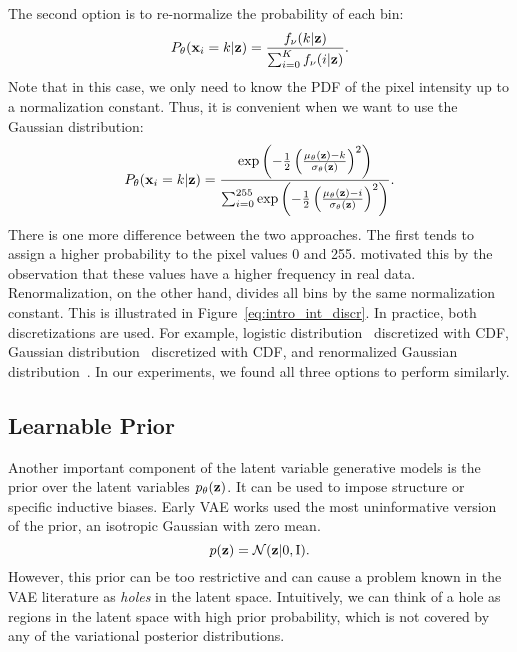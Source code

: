 The second option is to re-normalize the probability of each bin:
\begin{equation}\label{eq:intro_softmax_discr}
\begin{aligned}
    P_{\theta}(\rvx_i = k|\rvz) = \frac{f_{\nu}(k|\rvz)}{\sum_{i=0}^K f_{\nu}(i|\rvz)}.
\end{aligned}
\end{equation}
Note that in this case, we only need to know the PDF of the pixel intensity up to a normalization constant. 
Thus, it is convenient when we want to use the Gaussian distribution:
\begin{equation}
\begin{aligned}
    P_{\theta}({\mathbf{x}}_i = k|{\mathbf{z}}) = \frac{\exp\left(-\frac12 \left(\frac{\mu_{\theta}({\mathbf{z}}) - k}{\sigma_{\theta}({\mathbf{z}})}\right)^2\right)}{\sum_{i=0}^{255} \exp\left(-\frac12 \left(\frac{\mu_{\theta}({\mathbf{z}}) - i}{\sigma_{\theta}({\mathbf{z}})}\right)^2\right)}.
\end{aligned}
\end{equation}
There is one more difference between the two approaches. The first tends to assign a higher probability to the pixel values 0 and 255. \citet{salimans2016improved} motivated this by the observation that these values have a higher frequency in real data. Renormalization, on the other hand, divides all bins by the same normalization constant. This is illustrated in Figure~\ref{eq:intro_int_discr}.
In practice, both discretizations are used. 
For example, logistic distribution~\citep{vahdat2020nvae, Child2020-ze} discretized with CDF, Gaussian distribution~\citep{ho2020denoising} discretized with CDF, and renormalized Gaussian distribution~\citep{kingma2021variational}. 
In our experiments, we found all three options to perform similarly. 

\subsection{Learnable Prior}
Another important component of the latent variable generative models is the prior over the latent variables $p_{\theta}({\mathbf{z}})$.
It can be used to impose structure or specific inductive biases. 
Early VAE works used the most uninformative version of the prior, an isotropic Gaussian with zero mean.
\begin{equation}
    p({\mathbf{z}}) = \mathcal{N}({\mathbf{z}} | 0, \text{I}).
\end{equation}
\newline
However, this prior can be too restrictive and can cause a problem known in the VAE literature as \textit{holes} in the latent space. Intuitively, we can think of a hole as regions in the latent space with high prior probability, which is not covered by any of the variational posterior distributions. 

